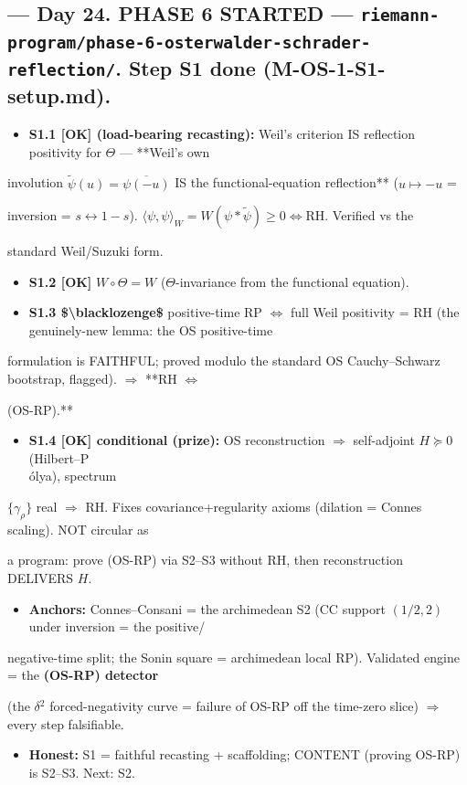 \documentclass[10pt]{article}
\begin{document}
\subsection*{ --- Day 24. PHASE 6 STARTED --- \texttt{riemann-program/phase-6-osterwalder-schrader-reflection/}. Step S1 done (M-OS-1-S1-setup.md).}
\begin{itemize}
\item \textbf{S1.1 [OK] (load-bearing recasting):} Weil's criterion IS reflection positivity for $\Theta$ --- **Weil's own
\end{itemize}
  involution $\tilde\psi(u)=\overline{\psi(-u)}$ IS the functional-equation reflection** ($u\mapsto-u$ =\par
  inversion = $s\leftrightarrow1-s$). $\langle\psi,\psi\rangle_W=W(\psi*\tilde\psi)\ge0\iff$RH. Verified vs the\par
  standard Weil/Suzuki form.\par
\begin{itemize}
\item \textbf{S1.2 [OK]} $W\circ\Theta=W$ ($\Theta$-invariance from the functional equation).
\item \textbf{S1.3 \$\textbackslash{}blacklozenge\$} positive-time RP $\iff$ full Weil positivity = RH (the genuinely-new lemma: the OS positive-time
\end{itemize}
  formulation is FAITHFUL; proved modulo the standard OS Cauchy--Schwarz bootstrap, flagged). \ensuremath{\Rightarrow} **RH $\iff$\par
  (OS-RP).**\par
\begin{itemize}
\item \textbf{S1.4 [OK] conditional (prize):} OS reconstruction \ensuremath{\Rightarrow} self-adjoint $H\succeq0$ (Hilbert--P\\\'olya), spectrum
\end{itemize}
  $\{\gamma_\rho\}$ real \ensuremath{\Rightarrow} RH. Fixes covariance+regularity axioms (dilation = Connes scaling). NOT circular as\par
  a program: prove (OS-RP) via S2--S3 without RH, then reconstruction DELIVERS $H$.\par
\begin{itemize}
\item \textbf{Anchors:} Connes--Consani = the archimedean S2 (CC support $(1/2,2)$ under inversion = the positive/
\end{itemize}
  negative-time split; the Sonin square = archimedean local RP). Validated engine = the \textbf{(OS-RP) detector}\par
  (the \ensuremath{\delta}\ensuremath{^2} forced-negativity curve = failure of OS-RP off the time-zero slice) \ensuremath{\Rightarrow} every step falsifiable.\par
\begin{itemize}
\item \textbf{Honest:} S1 = faithful recasting + scaffolding; CONTENT (proving OS-RP) is S2--S3. Next: S2.
\end{itemize}
\end{document}
